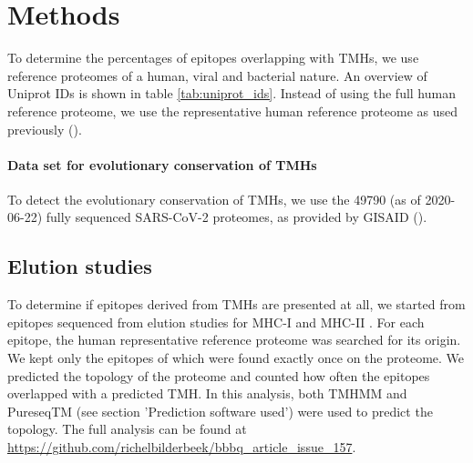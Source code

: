 \section{Methods}


To determine the percentages of epitopes overlapping
with TMHs, we use reference proteomes of 
a human, viral and bacterial nature.
An overview of Uniprot IDs is shown in table \ref{tab:uniprot_ids}.
Instead of using the full human reference proteome, we
use the representative human reference proteome 
as used previously (\cite{bianchi2017}).

\paragraph{Data set for evolutionary conservation of TMHs}

To detect the evolutionary conservation of TMHs,
we use the 49790 (as of 2020-06-22) fully sequenced SARS-CoV-2 proteomes, 
as provided by GISAID (\cite{shu2017gisaid}).

\subsection{Elution studies}

To determine if epitopes derived from TMHs are presented at all,
we started from epitopes sequenced from elution studies
for MHC-I \cite{schellens2015comprehensive} 
and MHC-II \cite{bergseng2015different}.
For each epitope, the human representative reference proteome
was searched for its origin.
We kept only the epitopes of which were found exactly once
on the proteome.
We predicted the topology of the proteome
and counted how often the epitopes overlapped
with a predicted TMH.
In this analysis, both TMHMM and 
PureseqTM (see section 'Prediction software used') 
were used to predict the topology.
The full analysis can be found
at \url{https://github.com/richelbilderbeek/bbbq_article_issue_157}.


